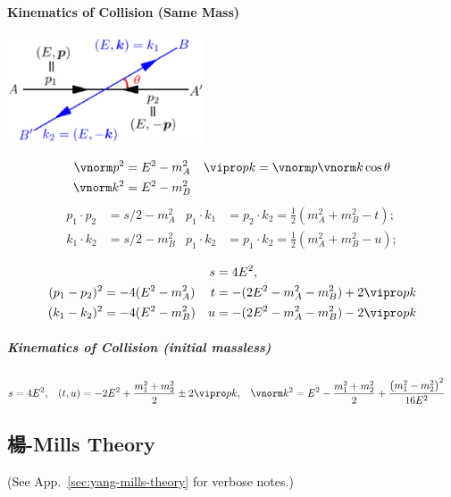 \paragraph{Kinematics of Collision (Same Mass)}\mbox{}\par
\begin{minipage}{167pt}
\includegraphics[width=165pt]{graphics/collision.eps}
\end{minipage}
\begin{minipage}{270pt}
\begin{align*}
 \vnorm p ^2 &= E^2-m_A^2 & \vipro pk &=\vnorm p \vnorm k\cos\theta\\
 \vnorm k ^2 &= E^2-m_B^2
\end{align*}\vspace{-27pt}
\begin{align*}
 p_1 \cdot p_2&=s/2-m_A^2 & p_1\cdot k_1  &= p_2 \cdot k_2 = \tfrac12(m_A^2+m_B^2-t);\\
 k_1 \cdot k_2&=s/2-m_B^2 & p_1 \cdot k_2 &= p_1 \cdot k_2 = \tfrac12(m_A^2+m_B^2-u);
\end{align*}\vskip-10pt
\end{minipage}
\begin{align*}
&&  s&= 4E^2,\\
 (p_1-p_2)^2&=-4(E^2-m_A^2)&
 t&= -(2E^2-m_A^2-m_B^2)+2\vipro pk\\
 (k_1-k_2)^2&=-4(E^2-m_B^2)&
 u&= -(2E^2-m_A^2-m_B^2)-2\vipro pk\\
\end{align*}
\subparagraph{Kinematics of Collision (initial massless)}\mbox{}\par
\begin{align*}
 s&= 4E^2,&
 (t,u) &= -2E^2+\frac{m_1^2+m_2^2}{2}\pm2\vipro pk,&
 \vnorm k ^2 &= E^2-\frac{m_1^2+m_2^2}{2}+\frac{\left(m_1^2-m_2^2\right)^2}{16 E^2}
\end{align*}
\newpage
\subsection{楊-Mills Theory}\label{sec:yang-mills-general}
\vskip-22pt\hskip160pt{\small(See App.~\ref{sec:yang-mills-theory} for verbose notes.)}\vspace{-1em}
